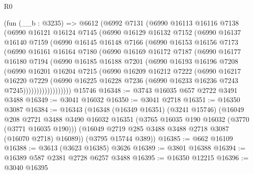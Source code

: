 \begin{lexlean}{R0}
\begin{coremodule}
    (fun (__b : @3235) =>
    @6612
      (@6992
        @7131
        (@6990
          @16113
          @16116
          @7138
          (@6990
            @16121
            @16124
            @7145
            (@6990
              @16129
              @16132
              @7152
              (@6990
                @16137
                @16140
                @7159
                (@6990
                  @16145
                  @16148
                  @7166
                  (@6990
                    @16153
                    @16156
                    @7173
                    (@6990
                      @16161
                      @16164
                      @7180
                      (@6990
                        @16169
                        @16172
                        @7187
                        (@6990
                          @16177
                          @16180
                          @7194
                          (@6990
                            @16185
                            @16188
                            @7201
                            (@6990
                              @16193
                              @16196
                              @7208
                              (@6990
                                @16201
                                @16204
                                @7215
                                (@6990
                                  @16209
                                  @16212
                                  @7222
                                  (@6990
                                    @16217
                                    @16220
                                    @7229
                                    (@6990
                                      @16225
                                      @16228
                                      @7236
                                      (@6990 @16233 @16236 @7243 @7245))))))))))))))))))
    @15746
@16348 := @3743 @16035 @657 @2722 @3491 @3488
@16349 := @3041 @16032
@16350 := @3041 @2718
@16351 := @16350 @3087
@16384 := @16343
    (@16348
      (@16349 @16351)
      (@3241 @15746)
      (@16049
        @208
        @2721
        @3488
        @3490
        @16032
        @16351
        (@3765 @16035 @190 @16032 (@3770 (@3771 @16035 @190)))
        (@16049 @2719 @285 @3488 @3488 @2718 @3087 (@16070 @2718) @16089))
      (@3795 @15744 @389))
@16385 := @662 @16109
@16388 := @3613 (@3623 @16385) @3626
@16389 := @3801 @16388
@16394 := @16389 @587 @2381 @2728 @6257 @3488
@16395 := @16350 @12215
@16396 := @3040 @16395

\end{coremodule}
\end{lexlean}
